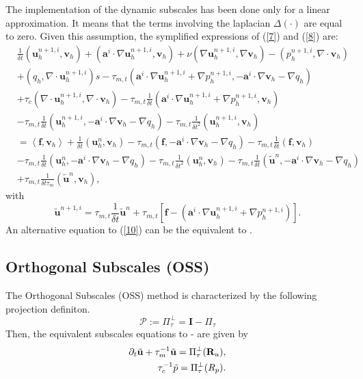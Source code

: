 The implementation of the dynamic subscales has been done only for a linear approximation. It means that the terms involving the laplacian $ \Delta(\cdot) $ are equal to zero. Given this assumption, the symplified expressions of (\ref{7}) and (\ref{8}) are:
\begin{align}
\label{9}
&\frac{1}{\delta t}(\mathbf{u}_h^{n+1,i},\mathbf{v}_h)+(\mathbf{a}^i\cdot\nabla\mathbf{u}_h^{n+1,i},\mathbf{v}_h)+\nu(\nabla\mathbf{u}_h^{n+1,i},\nabla\mathbf{v}_h)-(p_h^{n+1,i},\nabla\cdot\mathbf{v}_h)\\\nonumber
&+(q_h,\nabla\cdot\mathbf{u}_h^{n+1,i})s-\tau_{m,t}(\mathbf{a}^i\cdot\nabla\mathbf{u}_h^{n+1,i}+\nabla p_h^{n+1,i},-\mathbf{a}^i\cdot\nabla\mathbf{v}_h-\nabla q_h)\\\nonumber
&+\tau_c(\nabla\cdot\mathbf{u}_h^{n+1,i},\nabla\cdot\mathbf{v}_h)-\tau_{m,t}\frac{1}{\delta t}(\mathbf{a}^i\cdot\nabla\mathbf{u}_h^{n+1,i}+\nabla p_h^{n+1,i},\mathbf{v}_h)\\\nonumber
&-\tau_{m,t}\frac{1}{\delta t}(\mathbf{u}_h^{n+1,i},-\mathbf{a}^i\cdot\nabla\mathbf{v}_h-\nabla q_h)-\tau_{m,t}\frac{1}{\delta t^2}(\mathbf{u}_h^{n+1,i},\mathbf{v}_h)\\\nonumber
&=\left<\mathbf{f},\mathbf{v}_h\right>+\frac{1}{\delta t}(\mathbf{u}_h^n,\mathbf{v}_h)-\tau_{m,t}(\mathbf{f},-\mathbf{a}^i\cdot\nabla\mathbf{v}_h-\nabla q_h)-\tau_{m,t}\frac{1}{\delta t}(\mathbf{f},\mathbf{v}_h)\\\nonumber
&-\tau_{m,t}\frac{1}{\delta t}(\mathbf{u}_h^n,-\mathbf{a}^i\cdot\nabla\mathbf{v}_h-\nabla q_h)-\tau_{m,t}\frac{1}{\delta t^2}(\mathbf{u}_h^n,\mathbf{v}_h)-\tau_{m,t}\frac{1}{\delta t}(\tilde{\mathbf{u}}^n,-\mathbf{a}^i\cdot\nabla\mathbf{v}_h-\nabla q_h)\\\nonumber
&+\tau_{m,t}\frac{1}{\delta t\tau_m}(\tilde{\mathbf{u}}^n,\mathbf{v}_h),
\end{align}
with
\begin{equation}
\label{10}
\tilde{\mathbf{u}}^{n+1,i}=\tau_{m,t}\frac{1}{\delta t}\tilde{\mathbf{u}}^n+\tau_{m,t}\left[\mathbf{f}-(\mathbf{a}^i\cdot\nabla\mathbf{u}_h^{n+1,i}+\nabla p_h^{n+1,i})\right].
\end{equation}
An alternative equation to (\ref{10}) can be the equivalent to .

\subsection*{Orthogonal Subscales (OSS)}
The Orthogonal Subscales (OSS) method is characterized by the following projection definiton.
\begin{equation}
\label{11}
\mathcal{P}:=\Pi_\tau^\bot=\mathbf{I}-\Pi_\tau
\end{equation}
Then, the equivalent subscales equations to - are given by
\begin{align}
\label{eq-A2_velo_oss}
\partial_t\tilde{{\bf u}}+\tau_m^{-1}\tilde{{\bf u}}=\Pi_\tau^\bot({\bf R}_u),\\
\label{eq-A2_press_oss}
\tau_c^{-1}\tilde{p}=\Pi_\tau^\bot(R_p).
\end{align}

